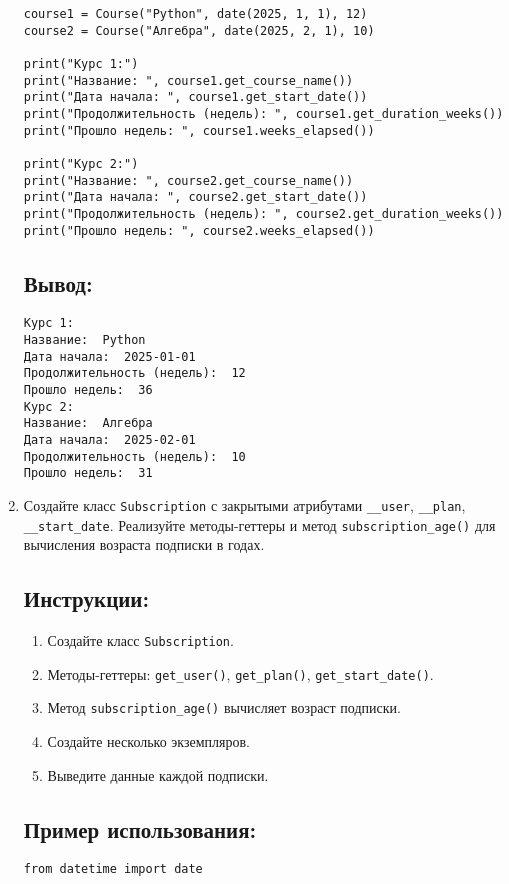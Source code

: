 \begin{enumerate}
\begin{lstlisting}[caption=Пример кода]
course1 = Course("Python", date(2025, 1, 1), 12)
course2 = Course("Алгебра", date(2025, 2, 1), 10)

print("Курс 1:")
print("Название: ", course1.get_course_name())
print("Дата начала: ", course1.get_start_date())
print("Продолжительность (недель): ", course1.get_duration_weeks())
print("Прошло недель: ", course1.weeks_elapsed())

print("Курс 2:")
print("Название: ", course2.get_course_name())
print("Дата начала: ", course2.get_start_date())
print("Продолжительность (недель): ", course2.get_duration_weeks())
print("Прошло недель: ", course2.weeks_elapsed())
\end{lstlisting}

\subsection*{Вывод:}
\begin{lstlisting}[caption=Ожидаемый вывод]
Курс 1:
Название:  Python
Дата начала:  2025-01-01
Продолжительность (недель):  12
Прошло недель:  36
Курс 2:
Название:  Алгебра
Дата начала:  2025-02-01
Продолжительность (недель):  10
Прошло недель:  31
\end{lstlisting}

\item
Создайте класс \texttt{Subscription} с закрытыми атрибутами \texttt{\_\_user}, \texttt{\_\_plan}, \texttt{\_\_start\_date}. Реализуйте методы-геттеры и метод \texttt{subscription\_age()} для вычисления возраста подписки в годах.

\subsection*{Инструкции:}
\begin{enumerate}
    \item Создайте класс \texttt{Subscription}.
    \item Методы-геттеры: \texttt{get\_user()}, \texttt{get\_plan()}, \texttt{get\_start\_date()}.
    \item Метод \texttt{subscription\_age()} вычисляет возраст подписки.
    \item Создайте несколько экземпляров.
    \item Выведите данные каждой подписки.
\end{enumerate}

\subsection*{Пример использования:}
\begin{lstlisting}[caption=Пример кода]
from datetime import date


\end{lstlisting}
\end{enumerate}
